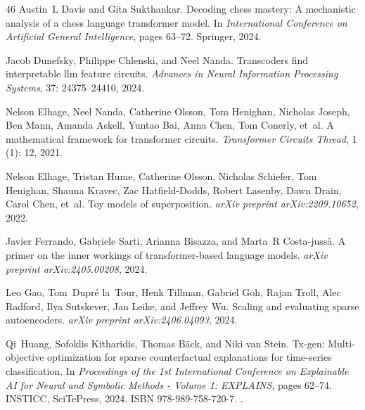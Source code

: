 \begin{thebibliography}{46}
Austin~L Davis and Gita Sukthankar.
\newblock Decoding chess mastery: A mechanistic analysis of a chess language transformer model.
\newblock In \emph{International Conference on Artificial General Intelligence}, pages 63--72. Springer, 2024.

Jacob Dunefsky, Philippe Chlenski, and Neel Nanda.
\newblock Transcoders find interpretable llm feature circuits.
\newblock \emph{Advances in Neural Information Processing Systems}, 37: 24375--24410, 2024.

Nelson Elhage, Neel Nanda, Catherine Olsson, Tom Henighan, Nicholas Joseph, Ben Mann, Amanda Askell, Yuntao Bai, Anna Chen, Tom Conerly, et~al.
\newblock A mathematical framework for transformer circuits.
\newblock \emph{Transformer Circuits Thread}, 1 (1): 12, 2021.

Nelson Elhage, Tristan Hume, Catherine Olsson, Nicholas Schiefer, Tom Henighan, Shauna Kravec, Zac Hatfield-Dodds, Robert Lasenby, Dawn Drain, Carol Chen, et~al.
\newblock Toy models of superposition.
\newblock \emph{arXiv preprint arXiv:2209.10652}, 2022.

Javier Ferrando, Gabriele Sarti, Arianna Bisazza, and Marta~R Costa-juss{\`a}.
\newblock A primer on the inner workings of transformer-based language models.
\newblock \emph{arXiv preprint arXiv:2405.00208}, 2024.

Leo Gao, Tom~Dupr{\'e} la~Tour, Henk Tillman, Gabriel Goh, Rajan Troll, Alec Radford, Ilya Sutskever, Jan Leike, and Jeffrey Wu.
\newblock Scaling and evaluating sparse autoencoders.
\newblock \emph{arXiv preprint arXiv:2406.04093}, 2024.

Qi~Huang, Sofoklis Kitharidis, Thomas Bäck, and Niki van Stein.
\newblock Tx-gen: Multi-objective optimization for sparse counterfactual explanations for time-series classification.
\newblock In \emph{Proceedings of the 1st International Conference on Explainable AI for Neural and Symbolic Methods - Volume 1: EXPLAINS}, pages 62--74. INSTICC, SciTePress, 2024.
\newblock ISBN 978-989-758-720-7.
\newblock {}.


\end{thebibliography}
